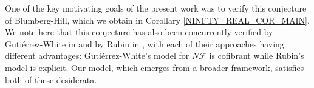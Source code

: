 \documentclass[a4paper,10pt
,draft
]{article}%
\numberwithin{equation}{section}
\numberwithin{figure}{section}
\theoremstyle{definition} %
\newcommand{\1}{\ensuremath{\mathbbm 1}}%
\begin{document}
One of the key motivating goals of the present work was to verify this conjecture of Blumberg-Hill, which we obtain in
Corollary \ref{NINFTY_REAL_COR_MAIN}.
We note here that this conjecture has also been concurrently verified
by Guti\'{e}rrez-White in \cite{GW18} 
and by Rubin in \cite{Rub17}, 
with each of their approaches having different advantages:
Guti\'{e}rrez-White's
model for $N \mathcal{F}$
is cofibrant 
while Rubin's model is explicit.
Our model, which emerges from a broader framework, satisfies both of these desiderata.

\end{document}
